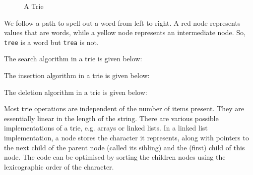 \documentclass[a4paper, openany]{memoir}
\begin{document}
\begin{figure}[H]
    \caption{A Trie}
\end{figure}
We follow a path to spell out a word from left to right. A red node represents values that are words, while a yellow node represents an intermediate node. So, \texttt{tree} is a word but \texttt{trea} is not.

The search algorithm in a trie is given below:

The insertion algorithm in a trie is given below:

The deletion algorithm in a trie is given below:

Most trie operations are independent of the number of items present. They are essentially linear in the length of the string.
There are various possible implementations of a trie, e.g. arrays or linked lists. In a linked list implementation, a node stores the character it represents, along with pointers to the next child of the parent node (called its sibling) and the (first) child of this node. The code can be optimised by sorting the children nodes using the lexicographic order of the character.
\end{document}
